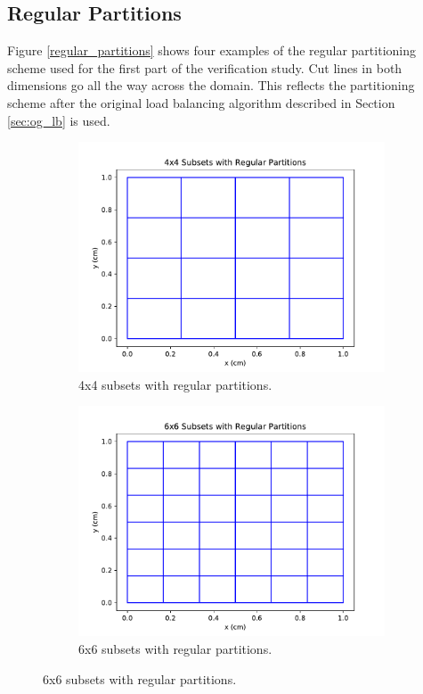 \subsection{Regular Partitions}

Figure \ref{regular_partitions} shows four examples of the regular partitioning scheme used for the first part of the verification study. Cut lines in both dimensions go all the way across the domain. This reflects the partitioning scheme after the original load balancing algorithm described in Section \ref{sec:og_lb} is used.

\begin{figure}[H]
\centering
\begin{subfigure}[b]{0.45\textwidth}
  \includegraphics[width=\textwidth]{../cut_line_files/4_regular.pdf}
  \caption{4x4 subsets with regular partitions.}
  \label{4regular}
\end{subfigure}
\begin{subfigure}[b]{0.45\textwidth}
  \includegraphics[width=\textwidth]{../cut_line_files/6_regular.pdf}
  \caption{6x6 subsets with regular partitions.}
  \label{6regular}
\end{subfigure}


\end{figure}
